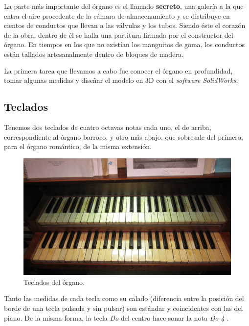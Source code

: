 \smallskip

La parte más importante del órgano es el llamado \textbf{secreto}, una galería a la que entra el aire procedente de la cámara de almacenamiento y se distribuye en cientos de conductos que llevan a las válvulas y los tubos. Siendo éste el corazón de la obra, dentro de él se halla una partitura firmada por el constructor del órgano. En tiempos en los que no existían los manguitos de goma, los conductos están tallados artesanalmente dentro de bloques de madera.

La primera tarea que llevamos a cabo fue conocer el órgano en profundidad, tomar algunas medidas y diseñar el modelo en 3D con el \textit{software} \textit{SolidWorks}.

\subsection{Teclados}

Tenemos dos teclados de cuatro octavas notas cada uno, el de arriba, correspondiente al órgano barroco, y otro más abajo, que sobresale del primero, para el órgano romántico, de la misma extensión.

\smallskip

\begin{figure}[H]
	\noindent \begin{centering}
		\includegraphics[width=\linewidth*3/4]{capitulo3/teclados}
		\par\end{centering}
	\smallskip
	\caption{\label{fig:teclados} Teclados del órgano.}
\end{figure} 

\smallskip

Tanto las medidas de cada tecla como su calado (diferencia entre la posición del borde de una tecla pulsada y sin pulsar) son estándar y coincidentes con las del piano. De la misma forma, la tecla \textit{Do} del centro hace sonar la nota \textit{Do 4} \footnotemark.

